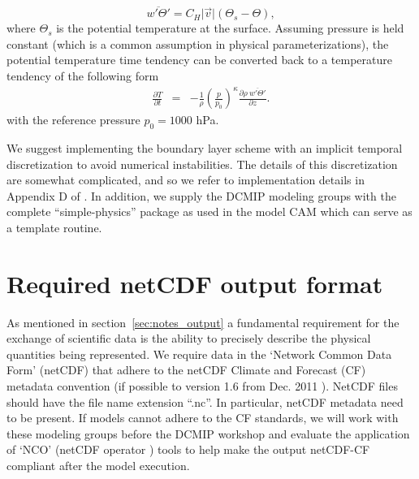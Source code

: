 \documentclass[times,doublespace]{fldauth}
\begin{document}
{\begin{appendix}
\begin{equation}
\overline{w'\Theta'} = C_H \vert \vec{v} \vert (\Theta_{s}-\Theta),
\end{equation} where $\Theta_{s}$ is the potential temperature at the surface.  Assuming pressure is held constant (which is a common assumption in physical parameterizations), the potential temperature time tendency can be converted back to a temperature tendency of the following form
\begin{eqnarray}
\frac{\partial T}{\partial t} &=& - \frac{1}{\rho} \left (\frac{p}{p_0} \right )^{\kappa} \frac{\partial \rho \ \overline{w'\Theta'}}{\partial z}.
\end{eqnarray}
with the reference pressure $p_0 = 1000$ hPa.

We suggest implementing the boundary layer scheme with an implicit temporal discretization to avoid numerical instabilities. The details of this discretization are somewhat complicated, and so we refer to implementation details in Appendix D of \cite{reed2012idealized}. In addition, we supply the DCMIP modeling groups with the complete ``simple-physics'' package as used in the model CAM which can serve as a template routine.


\section{Required netCDF output format} 
\label{sec:netcdf}
As mentioned in section~\ref{sec:notes_output} a fundamental requirement for the exchange of scientific data is the ability to  precisely describe the physical quantities being represented. We require data in the `Network Common Data Form' (netCDF) \cite{netcdf} that adhere to the netCDF Climate and Forecast (CF) metadata convention (if possible to version 1.6 from Dec. 2011 \cite{netcdf-cf}). NetCDF files should have the file name extension ``.nc''.
In particular, netCDF metadata need to be present. If models cannot adhere to the CF standards, we will work with these modeling groups before the DCMIP workshop and evaluate the application of `NCO' (netCDF operator \cite{nco}) tools to help make the output netCDF-CF compliant after the model execution. 


\end{appendix}}
\end{document}
